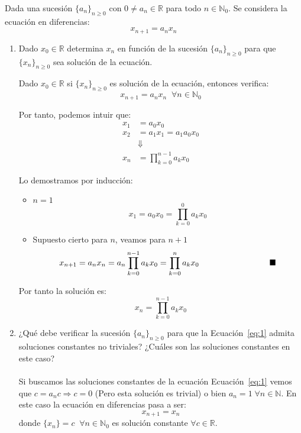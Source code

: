 \documentclass[12pt]{article}
\begin{document}
    \begin{ejercicio}[3 puntos]
        Dada una sucesión $\{a_n\}_{n\geq 0}$ con $0 \neq a_n\in \mathbb{R}$ para todo $n \in \mathbb{N}_0$. Se considera la ecuación en diferencias:
        \begin{equation}\label{eq:1}
        	x_{n+1}=a_n x_n
        \end{equation}
        
		\begin{enumerate}
        \item Dado $x_0 \in \mathbb{R}$ determina $x_n$ en función de la sucesión $\{a_n\}_{n\geq 0}$ para que $\{x_n\}_{n\geq 0}$ sea solución de la ecuación.
        
        Dado $x_0\in\mathbb{R}$ si $\{x_n\}_{n\geq 0}$ es solución de la ecuación, entonces verifica:
        \begin{equation*}
            x_{n+1}=a_n x_n \;\; \forall n \in\mathbb{N}_0  
        \end{equation*}
        
        Por tanto, podemos intuir que:
        \begin{align*}
        x_1&=a_0 x_0\\
        x_2&=a_1 x_1 = a_1 a_0 x_0\\
        &\Downarrow\\
        x_n&= \prod_{k=0}^{n-1} a_k  x_0
        \end{align*}
        
        Lo demostramos por inducción:
        \begin{itemize}
        \item $n=1$\\
        \[x_1 =a_0 x_0 = \prod_{k=0}^{0} a_k  x_0\]
        \item Supuesto cierto para $n$, veamos para $n+1$
        \[x_{n+1} = a_n x_n = a_n \prod_{k=0}^{n-1} a_k x_0 = \prod_{k=0}^{n} a_k  x_0\hspace{3cm}\hfill\blacksquare\]
        \end{itemize}
        
        Por tanto la solución es:
        \[x_n=\prod_{k=0}^{n-1}a_k x_0\]
        
        \item ¿Qué debe verificar la sucesión $\{a_n\}_{n\geq 0}$ para que la Ecuación~\ref{eq:1}  admita soluciones constantes no triviales? ¿Cuáles son las soluciones constantes en este caso?\\\\
        Si buscamos las soluciones constantes de la ecuación Ecuación~\ref{eq:1} vemos que $c = a_n c \Rightarrow c = 0$ (Pero esta solución es trivial) o bien $a_n = 1 \;\forall n \in \mathbb{N}$. En este caso la ecuación en diferencias pasa a ser:
        \[x_{n+1}=x_n\]
        donde $\{x_n\} = c \;\;\forall n \in\mathbb{N}_0$ es solución constante $\forall c \in \mathbb{R}$.
        

\end{enumerate}
\end{ejercicio}
\end{document}
